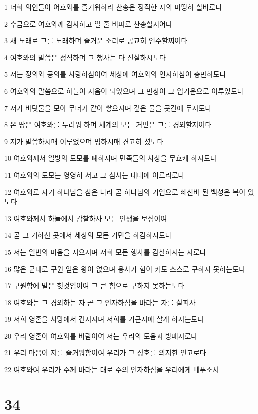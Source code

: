 \par 1 너희 의인들아 어호와를 즐거워하라 찬송은 정직한 자의 마땅히 할바로다
\par 2 수금으로 여호와께 감사하고 열 줄 비파로 찬송할지어다
\par 3 새 노래로 그를 노래하며 즐거운 소리로 공교히 연주할찌어다
\par 4 여호와의 말씀은 정직하며 그 행사는 다 진실하시도다
\par 5 저는 정의와 공의를 사랑하심이여 세상에 여호와의 인자하심이 충만하도다
\par 6 여호와의 말씀으로 하늘이 지음이 되었으며 그 만상이 그 입기운으로 이루었도다
\par 7 저가 바닷물을 모아 무더기 같이 쌓으시며 깊은 물을 곳간에 두시도다
\par 8 온 땅은 여호와를 두려워 하며 세계의 모든 거민은 그를 경외할지어다
\par 9 저가 말씀하시매 이루었으며 명하시매 견고히 셨도다
\par 10 여호와께서 열방의 도모를 폐하시며 민족들의 사상을 무효케 하시도다
\par 11 여호와의 도모는 영영히 서고 그 심사는 대대에 이르리로다
\par 12 여호와로 자기 하나님을 삼은 나라 곧 하나님의 기업으로 빼신바 된 백성은 복이 있도다
\par 13 여호와께서 하늘에서 감찰하사 모든 인생을 보심이여
\par 14 곧 그 거하신 곳에서 세상의 모든 거민을 하감하시도다
\par 15 저는 일반의 마음을 지으시며 저희 모든 행사를 감찰하시는 자로다
\par 16 많은 군대로 구원 얻은 왕이 없으며 용사가 힘이 커도 스스로 구하지 못하는도다
\par 17 구원함에 말은 헛것임이여 그 큰 힘으로 구하지 못하는도다
\par 18 여호와는 그 경외하는 자 곧 그 인자하심을 바라는 자를 살피사
\par 19 저희 영혼을 사망에서 건지시며 저희를 기근시에 살게 하시는도다
\par 20 우리 영혼이 여호와를 바람이여 저는 우리의 도움과 방패시로다
\par 21 우리 마음이 저를 즐거워함이여 우리가 그 성호를 의지한 연고로다
\par 22 여호와여 우리가 주께 바라는 대로 주의 인자하심을 우리에게 베푸소서

\chapter{34}

